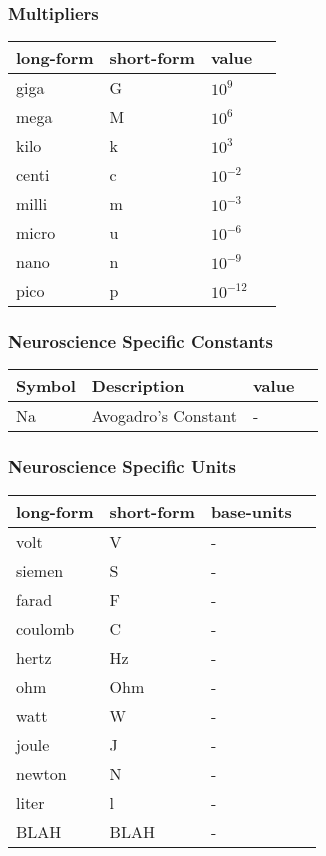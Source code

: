 \documentclass{article}
\begin{document}
\subsubsection{Multipliers}

\begin{center}
    \begin{tabular}{ | l | l |  l | p{5cm} |}
    \hline
    long-form & short-form & value  \\ \hline
    giga & G & $10^9$ \\ \hline
    mega & M & $10^6$ \\ \hline
    kilo & k & $10^3$ \\ \hline
    centi & c & $10^{-2}$ \\ \hline
    milli & m & $10^{-3}$ \\ \hline
    micro & u & $10^{-6}$ \\ \hline
    nano & n & $10^{-9}$ \\ \hline
    pico & p & $10^{-12}$ \\ \hline
    \end{tabular}
\end{center}




\subsubsection{Neuroscience Specific Constants}
\begin{center}
    \begin{tabular}{ | l | l |  l | p{5cm} |}
    \hline
    Symbol & Description & value  \\ \hline
    Na & Avogadro's Constant & - \\ \hline
    \end{tabular}
\end{center}



\subsubsection{Neuroscience Specific Units}

\begin{center}
    \begin{tabular}{ | l | l |  l | p{5cm} |}
    \hline
    long-form & short-form & base-units  \\ \hline
    volt & V & - \\ \hline
    siemen & S & - \\ \hline
    farad & F & - \\ \hline
    coulomb & C & - \\ \hline
    hertz & Hz & - \\ \hline
    ohm & Ohm & - \\ \hline
    watt & W & - \\ \hline
    joule & J & - \\ \hline
    newton & N & - \\ \hline
    liter & l & - \\ \hline
    BLAH & BLAH & - \\ \hline
    \end{tabular}
\end{center}
\end{document}
